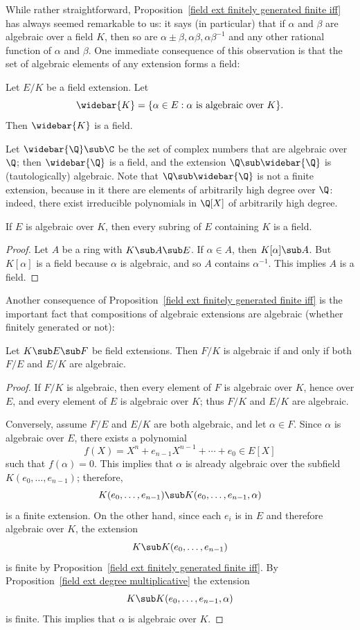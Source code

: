 While rather straightforward, Proposition~\ref{field ext finitely generated finite iff} has always seemed remarkable to us: it says (in particular) that if $\alpha$ and $\beta$ are algebraic over a field $K$, then so are $\alpha\pm\beta,\alpha\beta,\alpha\beta^{-1}$ and any other rational function of $\alpha$ and $\beta$. One immediate consequence of this observation is that the set of algebraic elements of any extension forms a field:
\begin{corollary}\label{field ext algebraic elements form field}
Let $E/K$ be a field extension. Let
\[\widebar{K}=\{\alpha\in E:\alpha\text{ is algebraic over $K$}\}.\]
Then $\widebar{K}$ is a field.
\end{corollary}
\begin{example}
Let $\widebar{\Q}\sub\C$ be the set of complex numbers that are algebraic over $\Q$; then $\widebar{\Q}$ is a field, and the extension $\Q\sub \widebar{\Q}$ is (tautologically) algebraic. Note that $\Q\sub\widebar{\Q}$ is not a finite extension, because in it there are elements of arbitrarily high degree over $\Q$: indeed, there exist irreducible polynomials in $\Q[X]$ of arbitrarily high degree.
\end{example}
\begin{corollary}
If $E$ is algebraic over $K$, then every subring of $E$ containing $K$ is a field.
\end{corollary}
\begin{proof}
Let $A$ be a ring with $K\sub A\sub E$. If $\alpha\in A$, then $K[\alpha]\sub A$. But $K[\alpha]$ is a field because $\alpha$ is algebraic, and so $A$ contains $\alpha^{-1}$. This implies $A$ is a field.
\end{proof}
Another consequence of Proposition~\ref{field ext finitely generated finite iff} is the important fact that compositions of algebraic extensions are algebraic (whether finitely generated or not):
\begin{corollary}\label{field ext intermediate algebraic iff}
Let $K\sub E\sub F$ be field extensions. Then $F/K$ is algebraic if and only if both $F/E$ and $E/K$ are algebraic.
\end{corollary}
\begin{proof}
If $F/K$ is algebraic, then every element of $F$ is algebraic over $K$, hence over $E$, and every element of $E$ is algebraic over $K$; thus $F/K$ and $E/K$ are algebraic.\par
Conversely, assume $F/E$ and $E/K$ are both algebraic, and let $\alpha\in F$. Since $\alpha$ is algebraic over $E$, there exists a polynomial
\[f(X)=X^n+e_{n-1}X^{n-1}+\cdots+e_0\in E[X]\]
such that $f(\alpha)=0$. This implies that $\alpha$ is already algebraic over the subfield $K(e_0,\dots,e_{n-1})$; therefore,
\[K(e_0,\dots,e_{n-1})\sub K(e_0,\dots,e_{n-1},\alpha)\]
is a finite extension. On the other hand, since each $e_i$ is in $E$ and therefore algebraic over $K$, the extension
\[K\sub K(e_0,\dots,e_{n-1})\]
is finite by Proposition~\ref{field ext finitely generated finite iff}. By Proposition~\ref{field ext degree multiplicative} the extension
\[K\sub K(e_0,\dots,e_{n-1},\alpha)\]
is finite. This implies that $\alpha$ is algebraic over $K$.
\end{proof}
